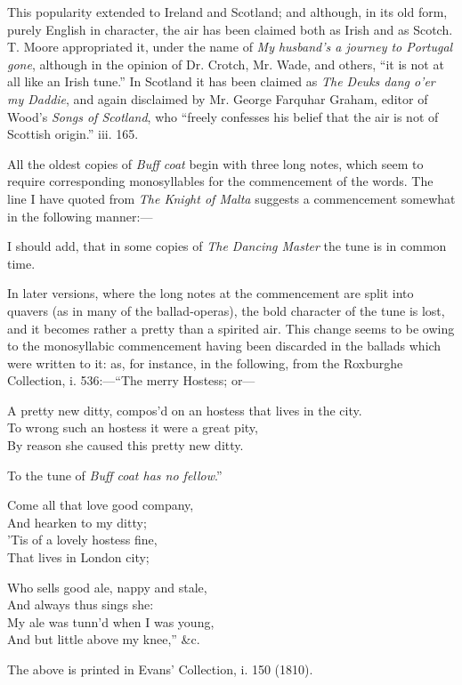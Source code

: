 This popularity extended to Ireland and Scotland; and although, in its old
form, purely English in character, the air has been claimed both as Irish and as
Scotch. T. Moore appropriated it, under the name of \textit{My husband’s a journey to 
Portugal gone}, although in the opinion of \pagebreak Dr. Crotch, Mr. Wade, and others, “it is
not at all like an Irish tune.” In Scotland it has been claimed as \textit{The Deuks
dang o'er my Daddie}, and again disclaimed by Mr. George Farquhar Graham,
editor of Wood’s \textit{Songs of Scotland}, who “freely confesses his belief that the air
is not of Scottish origin.” iii. 165.

All the oldest copies of \textit{Buff coat} begin with three long notes, which seem to
require corresponding monosyllables for the commencement of the words. The
line I have quoted from \textit{The Knight of Malta} suggests a commencement somewhat
in the following manner:—



I should add, that in some copies of \textit{The Dancing Master} the tune is in common
time.

In later versions, where the long notes at the commencement are split into
quavers (as in many of the ballad-operas), the bold character of the tune is lost,
and it becomes rather a pretty than a spirited air. This change seems to be
owing to the monosyllabic commencement having been discarded in the ballads
which were written to it: as, for instance, in the following, from the Roxburghe
Collection, i. 536:—“The merry Hostess; or—
\settowidth{\versewidth}{A pretty new ditty, compos’d on an hostess that lives in the city.}
\begin{scverse}
A pretty new ditty, compos’d on an hostess that lives in the city.\\
To wrong such an hostess it were a great pity,\\
By reason she caused this pretty new ditty.
\end{scverse}
To the tune of \textit{Buff coat has no fellow}.”
\settowidth{\versewidth}{Come all that love good company,}
\begin{dcverse}\begin{altverse}
Come all that love good company,\\
And hearken to my ditty;\\
’Tis of a lovely hostess fine,\\
That lives in London city;
\end{altverse}

\begin{altverse}
Who sells good ale, nappy and stale,\\
And always thus sings she:\\
My ale was tunn’d when I was young,\\
And but little above my knee,” \&c.
\end{altverse}
\end{dcverse}
The above is printed in Evans’ Collection, i. 150 (1810).
\pagebreak

